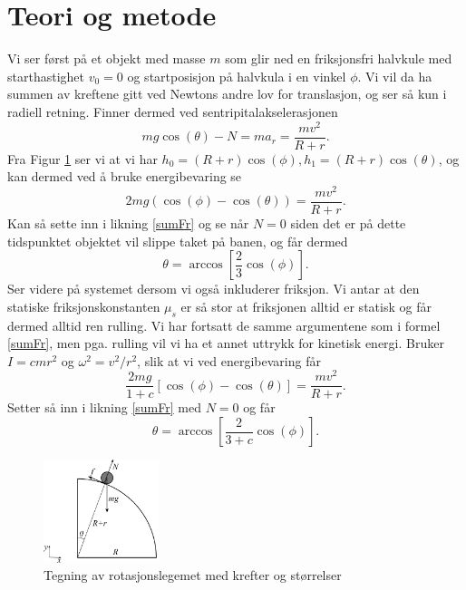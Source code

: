 \documentclass[5p]{elsarticle}
\begin{document}
	\section{Teori og metode}
	Vi ser først på et objekt med masse $m$ som glir ned en friksjonsfri halvkule med starthastighet $v_0 = 0$ og startposisjon på halvkula i en vinkel $\phi$. Vi vil da ha summen av kreftene gitt ved Newtons andre lov for translasjon, og 	ser så kun i radiell retning. Finner dermed ved sentripitalakselerasjonen
	\begin{equation}\label{sumFr}
		mg\cos(\theta) - N = ma_r = \frac{mv^2}{R+r} .
	\end{equation}
	Fra Figur \ref{figur} ser vi at vi har $h_0 = (R+r)\cos(\phi), h_1 = (R+r)\cos(\theta)$, og kan dermed ved å bruke energibevaring se
	\begin{equation}\label{vel_form}
		2mg (\cos(\phi) - \cos(\theta)) = \frac{mv^2}{R+r} .
	\end{equation}
	Kan så sette inn i likning \eqref{sumFr} og se når $N=0$ siden det er på dette tidspunktet objektet vil slippe taket på banen, og får dermed
	\begin{equation}\label{anal_løs}
	    \theta = \arccos\left[ \frac{2}{3}\cos(\phi) \right] .
	\end{equation}
	Ser videre på systemet dersom vi også inkluderer friksjon. Vi antar at den statiske friksjonskonstanten $\mu _s$ er så stor at friksjonen alltid er statisk og får dermed alltid ren rulling. Vi har fortsatt de samme argumentene som i formel \eqref{sumFr}, men pga. rulling vil vi ha et annet uttrykk for kinetisk energi. Bruker $I = cmr^2$ og $\omega ^2 = v^2 / r^2$, slik at vi ved energibevaring får
	\begin{equation}
		\frac{2mg}{1+c}\left[\cos(\phi) - \cos(\theta)\right] = \frac{mv^2}{R+r} .
	\end{equation}
	Setter så inn i likning \eqref{sumFr} med $N=0$ og får
	\begin{equation} \label{anal_rulling}
		\theta = \arccos \left[ \frac{2}{3+c}\cos(\phi) \right] .
	\end{equation}
	
	\begin{figure}[H]
	    \centering
	    \includegraphics[width=0.3\textwidth]{figur1_good}
	    \caption{Tegning av rotasjonslegemet med krefter og størrelser}
	    \label{figur}
	\end{figure}
	
\end{document}
